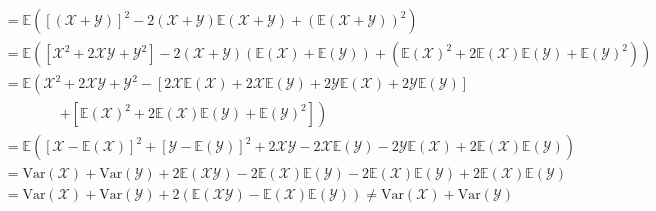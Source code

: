 \begin{enumerate}
\begin{myproof}
\begin{align*}
                      &= \mathbb E \left([(\mathcal X + \mathcal Y)]^2 - 2(\mathcal X + \mathcal Y)\mathbb E(\mathcal X + \mathcal Y) + (\mathbb E(\mathcal X + \mathcal Y))^2\right) \\
                      &= \mathbb E \left([\mathcal X^2 + 2\mathcal X \mathcal Y + \mathcal Y^2] - 2(\mathcal X + \mathcal Y)(\mathbb E(\mathcal X) + \mathbb E(\mathcal Y)) + (\mathbb E(\mathcal X)^2 + 2\mathbb E(\mathcal X)\mathbb E(\mathcal Y) + \mathbb E(\mathcal Y)^2)\right) \\
                      &= \mathbb E \left(\mathcal X^2 + 2\mathcal X \mathcal Y + \mathcal Y^2 - [2\mathcal X\mathbb E(\mathcal X) + 2\mathcal X\mathbb E(\mathcal Y) + 2\mathcal Y\mathbb E(\mathcal X) + 2\mathcal Y\mathbb E(\mathcal Y)] \right. \\
                      &\qquad\qquad \left. + [\mathbb E(\mathcal X)^2 + 2\mathbb E(\mathcal X)\mathbb E(\mathcal Y) + \mathbb E(\mathcal Y)^2]\right) \\
                      &= \mathbb E \left([\mathcal X - \mathbb E(\mathcal X)]^2 + [\mathcal Y - \mathbb E(\mathcal Y)]^2 + 2\mathcal X \mathcal Y - 2\mathcal X\mathbb E(\mathcal Y) - 2\mathcal Y\mathbb E(\mathcal X) + 2\mathbb E(\mathcal X)\mathbb E(\mathcal Y)\right) \\
                      &= \text{Var}(\mathcal X) + \text{Var}(\mathcal Y) + 2\mathbb E(\mathcal X \mathcal Y) - 2\mathbb E(\mathcal X)\mathbb E(\mathcal Y) - 2\mathbb E(\mathcal X)\mathbb E(\mathcal Y) + 2\mathbb E(\mathcal X)\mathbb E(\mathcal Y) \\
                      &= \text{Var}(\mathcal X) + \text{Var}(\mathcal Y) + 2(\mathbb E(\mathcal X \mathcal Y) - \mathbb E(\mathcal X)\mathbb E(\mathcal Y)) \neq \text{Var}(\mathcal X) + \text{Var}(\mathcal Y)
    \end{align*}
  \end{myproof}
\end{enumerate}

